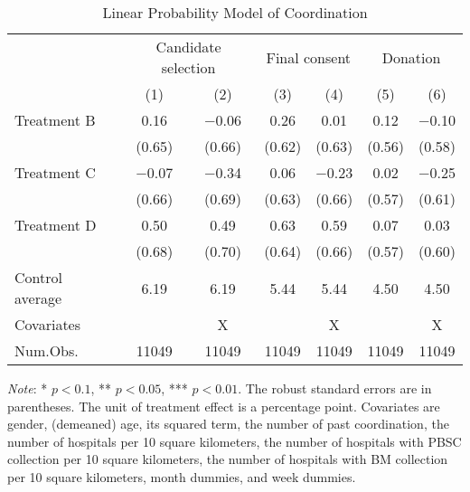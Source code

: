 \documentclass[12pt, a4paper]{article}
\begin{document}
\begin{table}[H]

\caption{\label{tab:coordinate-reg}Linear Probability Model of Coordination}
\centering
\fontsize{9}{11}\selectfont
\begin{threeparttable}
\begin{tabular}[t]{lcccccc}
\toprule
\multicolumn{1}{c}{ } & \multicolumn{2}{c}{Candidate selection} & \multicolumn{2}{c}{Final consent} & \multicolumn{2}{c}{Donation} \\
\cmidrule(l{3pt}r{3pt}){2-3} \cmidrule(l{3pt}r{3pt}){4-5} \cmidrule(l{3pt}r{3pt}){6-7}
  & (1) & (2) & (3) & (4) & (5) & (6)\\
\midrule
Treatment B & \num{0.16} & \num{-0.06} & \num{0.26} & \num{0.01} & \num{0.12} & \num{-0.10}\\
 & (\num{0.65}) & (\num{0.66}) & (\num{0.62}) & (\num{0.63}) & (\num{0.56}) & (\num{0.58})\\
Treatment C & \num{-0.07} & \num{-0.34} & \num{0.06} & \num{-0.23} & \num{0.02} & \num{-0.25}\\
 & (\num{0.66}) & (\num{0.69}) & (\num{0.63}) & (\num{0.66}) & (\num{0.57}) & (\num{0.61})\\
Treatment D & \num{0.50} & \num{0.49} & \num{0.63} & \num{0.59} & \num{0.07} & \num{0.03}\\
 & (\num{0.68}) & (\num{0.70}) & (\num{0.64}) & (\num{0.66}) & (\num{0.57}) & (\num{0.60})\\
\midrule
Control average & 6.19 & 6.19 & 5.44 & 5.44 & 4.50 & 4.50\\
Covariates &  & X &  & X &  & X\\
Num.Obs. & \num{11049} & \num{11049} & \num{11049} & \num{11049} & \num{11049} & \num{11049}\\
\bottomrule
\end{tabular}
\begin{tablenotes}
\item \emph{Note}: * $p < 0.1$, ** $p < 0.05$, *** $p < 0.01$. The robust standard errors are in parentheses. The unit of treatment effect is a percentage point. Covariates are gender, (demeaned) age, its squared term, the number of past coordination, the number of hospitals per 10 square kilometers, the number of hospitals with PBSC collection per 10 square kilometers, the number of hospitals with BM collection per 10 square kilometers, month dummies, and week dummies.
\end{tablenotes}
\end{threeparttable}
\end{table}
\end{document}
